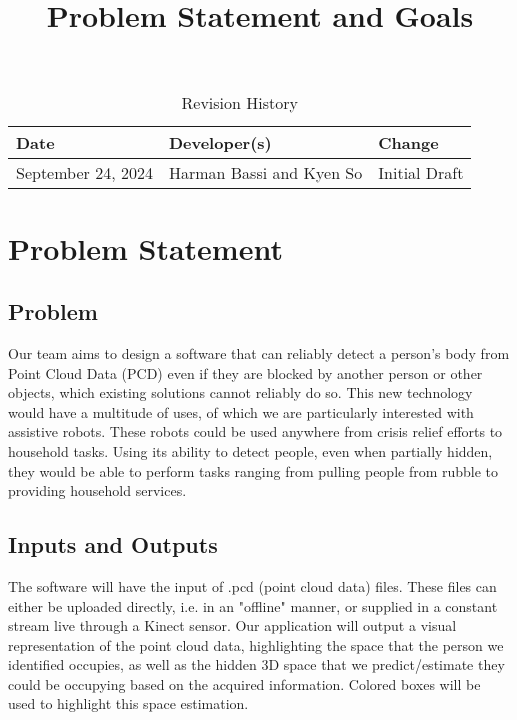 \documentclass{article}
\title{Problem Statement and Goals\\\progname}
\author{\authname}
\date{}
\begin{document}
\maketitle

\begin{table}[hp]
\caption{Revision History} \label{TblRevisionHistory}
\begin{tabularx}{\textwidth}{llX}
\toprule
\textbf{Date} & \textbf{Developer(s)} & \textbf{Change}\\
\midrule
September 24, 2024 & Harman Bassi and Kyen So & Initial Draft\\
\bottomrule
\end{tabularx}
\end{table}

\newpage

\section{Problem Statement}

\subsection{Problem}
Our team aims to design a software that can reliably detect a person’s body from Point Cloud Data (PCD) even if they are blocked by another person or other objects, which existing solutions cannot reliably do so. This new technology would have a multitude of uses, of which we are particularly interested with assistive robots. These robots could be used anywhere from crisis relief efforts to household tasks. Using its ability to detect people, even when partially hidden, they would be able to perform tasks ranging from pulling people from rubble to providing household services. 

\subsection{Inputs and Outputs}
The software will have the input of .pcd (point cloud data) files. These files can either be uploaded directly, i.e. in an "offline" manner, or supplied in a constant stream live through a Kinect sensor. Our application will output a visual representation of the point cloud data, highlighting the space that the person we identified occupies, as well as the hidden 3D space that we predict/estimate they could be occupying based on the acquired information. Colored boxes will be used to highlight this space estimation.
\end{document}
